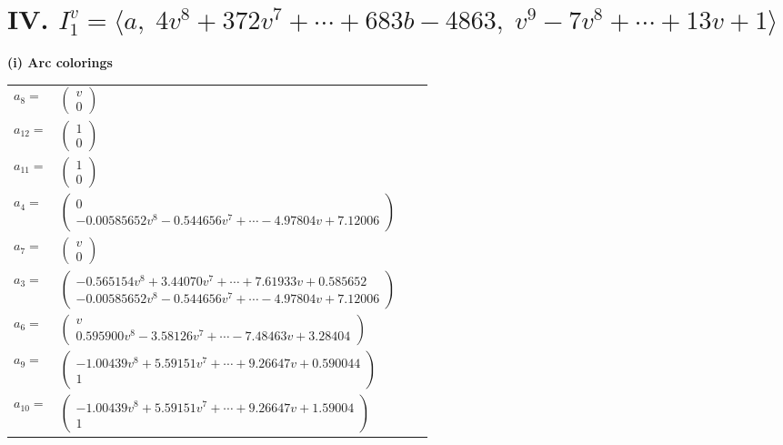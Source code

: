 \documentclass[1p]{elsarticle_modified}
\theoremstyle{definition}
\begin{document}
\centering \section*{IV. $I^v_{1}= \langle a,\;4 v^8+372 v^7+\cdots+683 b-4863,\;v^9-7 v^8+\cdots+13 v+1 \rangle$}
\flushleft \textbf{(i) Arc colorings}\\
\begin{tabular}{m{7pt} m{180pt} m{7pt} m{180pt} }
\flushright $a_{8}=$&$\begin{pmatrix}v\\0\end{pmatrix}$ \\
\flushright $a_{12}=$&$\begin{pmatrix}1\\0\end{pmatrix}$ \\
\flushright $a_{11}=$&$\begin{pmatrix}1\\0\end{pmatrix}$ \\
\flushright $a_{4}=$&$\begin{pmatrix}0\\-0.00585652 v^{8}-0.544656 v^{7}+\cdots-4.97804 v+7.12006\end{pmatrix}$ \\
\flushright $a_{7}=$&$\begin{pmatrix}v\\0\end{pmatrix}$ \\
\flushright $a_{3}=$&$\begin{pmatrix}-0.565154 v^{8}+3.44070 v^{7}+\cdots+7.61933 v+0.585652\\-0.00585652 v^{8}-0.544656 v^{7}+\cdots-4.97804 v+7.12006\end{pmatrix}$ \\
\flushright $a_{6}=$&$\begin{pmatrix}v\\0.595900 v^{8}-3.58126 v^{7}+\cdots-7.48463 v+3.28404\end{pmatrix}$ \\
\flushright $a_{9}=$&$\begin{pmatrix}-1.00439 v^{8}+5.59151 v^{7}+\cdots+9.26647 v+0.590044\\1\end{pmatrix}$ \\
\flushright $a_{10}=$&$\begin{pmatrix}-1.00439 v^{8}+5.59151 v^{7}+\cdots+9.26647 v+1.59004\\1\end{pmatrix}$ \\

\end{tabular}
\end{document}
